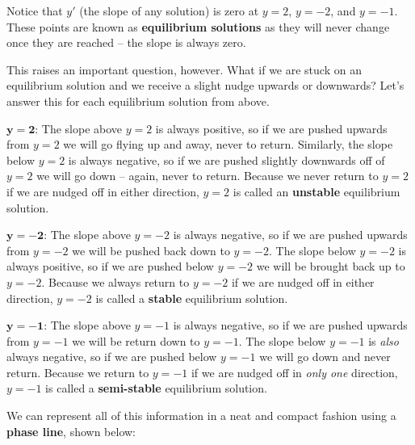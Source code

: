 Notice that $y'$ (the slope of any solution) is zero at $y = 2$, $y = -2$, and $y = -1$. These points are known as \textbf{equilibrium solutions} as they will never change once they are reached – the slope is always zero.

This raises an important question, however. What if we are stuck on an equilibrium solution and we receive a slight nudge upwards or downwards? Let's answer this for each equilibrium solution from above.

$\bm{y = 2}$: The slope above $y = 2$ is always positive, so if we are pushed upwards from $y = 2$ we will go flying up and away, never to return. Similarly, the slope below $y = 2$ is always negative, so if we are pushed slightly downwards off of $y = 2$ we will go down – again, never to return. Because we never return to $y = 2$ if we are nudged off in either direction, $y = 2$ is called an \textbf{unstable} equilibrium solution.

\pagebreak

$\bm{y = -2}$: The slope above $y = -2$ is always negative, so if we are pushed upwards from $y = -2$ we will be pushed back down to $y = -2$. The slope below $y = -2$ is always positive, so if we are pushed below $y = -2$ we will be brought back up to $y = -2$. Because we always return to $y = -2$ if we are nudged off in either direction, $y = -2$ is called a \textbf{stable} equilibrium solution.

$\bm{y = -1}$: The slope above $y = -1$ is always negative, so if we are pushed upwards from $y = -1$ we will be return down to $y = -1$. The slope below $y = -1$ is \textit{also} always negative, so if we are pushed below $y = -1$ we will go down and never return. Because we return to $y = -1$ if we are nudged off in \textit{only one} direction, $y = -1$ is called a \textbf{semi-stable} equilibrium solution.

We can represent all of this information in a neat and compact fashion using a \textbf{phase line}, shown below:

\begin{center}
\end{center}

